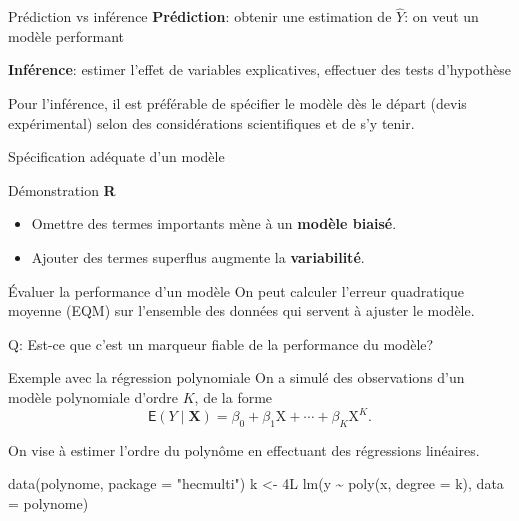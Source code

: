 \documentclass[
  ignorenonframetext,
]{beamer}
\newenvironment{Shaded}{\begin{snugshade}}{\end{snugshade}}
\newcommand{\AttributeTok}[1]{\textcolor[rgb]{0.40,0.45,0.13}{#1}}
\newcommand{\FunctionTok}[1]{\textcolor[rgb]{0.28,0.35,0.67}{#1}}
\newcommand{\NormalTok}[1]{\textcolor[rgb]{0.00,0.23,0.31}{#1}}
\newcommand{\OtherTok}[1]{\textcolor[rgb]{0.00,0.23,0.31}{#1}}
\newcommand{\SpecialCharTok}[1]{\textcolor[rgb]{0.37,0.37,0.37}{#1}}
\newcommand{\StringTok}[1]{\textcolor[rgb]{0.13,0.47,0.30}{#1}}
\providecommand{\tightlist}{%
  \setlength{\itemsep}{0pt}\setlength{\parskip}{0pt}}\usepackage{longtable,booktabs,array}
\begin{document}
\begin{frame}{Prédiction vs inférence}
\protect\hypertarget{pruxe9diction-vs-infuxe9rence}{}
\textbf{Prédiction}: obtenir une estimation de \(\widehat{Y}\): on veut
un modèle performant

\textbf{Inférence}: estimer l'effet de variables explicatives, effectuer
des tests d'hypothèse

Pour l'inférence, il est préférable de spécifier le modèle dès le départ
(devis expérimental) selon des considérations scientifiques et de s'y
tenir.
\end{frame}

\begin{frame}{Spécification adéquate d'un modèle}
\protect\hypertarget{spuxe9cification-aduxe9quate-dun-moduxe8le}{}
\begin{block}{Démonstration \textbf{R}}
\protect\hypertarget{duxe9monstration-r}{}
\begin{itemize}
\tightlist
\item
  Omettre des termes importants mène à un \textbf{modèle biaisé}.
\item
  Ajouter des termes superflus augmente la \textbf{variabilité}.
\end{itemize}
\end{block}
\end{frame}

\begin{frame}{Évaluer la performance d'un modèle}
\protect\hypertarget{uxe9valuer-la-performance-dun-moduxe8le}{}
On peut calculer l'erreur quadratique moyenne (EQM) sur l'ensemble des
données qui servent à ajuster le modèle.

Q: Est-ce que c'est un marqueur fiable de la performance du modèle?
\end{frame}

\begin{frame}[fragile]{Exemple avec la régression polynomiale}
\protect\hypertarget{exemple-avec-la-ruxe9gression-polynomiale}{}
On a simulé des observations d'un modèle polynomiale d'ordre \(K\), de
la forme
\[\mathsf{E}(Y \mid \mathbf{X}) = \beta_0 + \beta_1 \mathrm{X} + \cdots + \beta_K \mathrm{X}^K.\]

On vise à estimer l'ordre du polynôme en effectuant des régressions
linéaires.

\begin{Shaded}
\begin{Highlighting}[numbers=left,,]
\FunctionTok{data}\NormalTok{(polynome, }\AttributeTok{package =} \StringTok{"hecmulti"}\NormalTok{)}
\NormalTok{k }\OtherTok{\textless{}{-}}\NormalTok{ 4L}
\FunctionTok{lm}\NormalTok{(y }\SpecialCharTok{\textasciitilde{}} \FunctionTok{poly}\NormalTok{(x, }\AttributeTok{degree =}\NormalTok{ k), }
   \AttributeTok{data =}\NormalTok{ polynome)}
\end{Highlighting}
\end{Shaded}
\end{frame}
\end{document}
